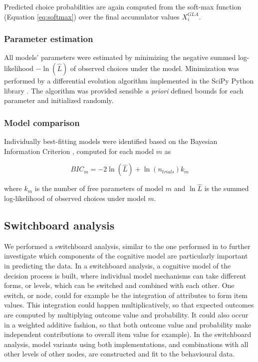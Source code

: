 \documentclass[11pt, a4paper]{article}
\begin{document}
Predicted choice probabilities are again computed from the soft-max function (Equation \ref{eq:softmax}) over the final accumulator values $X_i^{GLA}$.

\subsubsection*{Parameter estimation}

All models' parameters were estimated by minimizing the negative summed log-likelihood $-\ln{(\hat{L})}$ of observed choices under the model. Minimization was performed by a differential evolution algorithm \parencite{storn1997DifferentialEvolutionSimple} implemented in the SciPy Python library \parencite[][version 1.2.1]{jones2001SciPyOpenSource}. The algorithm was provided sensible \emph{a priori} defined bounds for each parameter and initialized randomly.

\subsubsection*{Model comparison}

Individually best-fitting models were identified based on the Bayesian Information Criterion \parencite[BIC;][]{schwarz1978EstimatingDimensionModel}, computed for each model $m$ as

\begin{equation}
    \label{eq:bic}
    BIC_m = -2 \ln{(\hat{L})} + \ln{(n_{trials})} k_m
\end{equation}

where $k_m$ is the number of free parameters of model $m$ and $\ln{\hat{L}}$ is the summed log-likelihood of observed choices under model $m$.

\subsection*{Switchboard analysis}
\label{sec:methods:switchboard}

We performed a switchboard analysis, similar to the one performed in \textcite{turner2018CompetingTheoriesMultialternative} to further investigate which components of the cognitive model are particularly important in predicting the data. In a switchboard analysis, a cognitive model of the decision process is built, where individual model mechanisms can take different forms, or levels, which can be switched and combined with each other. One switch, or node, could for example be the integration of attributes to form item values. This integration could happen multiplicatively, so that expected outcomes are computed by multiplying outcome value and probability. It could also occur in a weighted additive fashion, so that both outcome value and probability make independent contributions to overall item value \parencite[see][, for example]{rouault2019PrefrontalMechanismsCombining}for example). In the switchboard analysis, model variants using both implementations, and combinations with all other levels of other nodes, are constructed and fit to the behavioural data.
\end{document}
